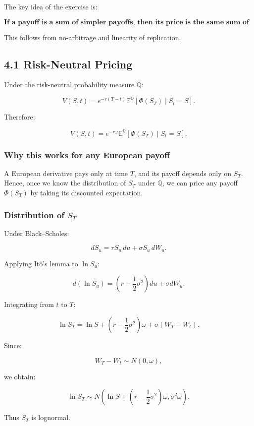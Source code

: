 \documentclass[11pt]{article}
\begin{document}
The key idea of the exercise is:

\[
\textbf{If a payoff is a sum of simpler payoffs, then its price is the same sum of prices.}
\]

This follows from no-arbitrage and linearity of replication.

\subsection*{4.1 Risk-Neutral Pricing}

Under the risk-neutral probability measure $\mathbb Q$:

\[
V(S,t)=e^{-r(T-t)}\mathbb E^{\mathbb Q}[\Phi(S_T)\mid S_t=S].
\]

Therefore:

\[
V(S,t)=e^{-r\omega}\mathbb E^{\mathbb Q}[\Phi(S_T)\mid S_t=S].
\]

\subsubsection*{Why this works for any European payoff}

A European derivative pays only at time $T$, and its payoff depends only on $S_T$.  
Hence, once we know the distribution of $S_T$ under $\mathbb Q$, we can price any payoff $\Phi(S_T)$ by taking its discounted expectation.

\subsubsection*{Distribution of $S_T$}

Under Black--Scholes:

\[
dS_u=rS_u\,du+\sigma S_u\,dW_u.
\]

Applying It\^o's lemma to $\ln S_u$:

\[
d(\ln S_u)=\left(r-\frac12\sigma^2\right)du+\sigma dW_u.
\]

Integrating from $t$ to $T$:

\[
\ln S_T=\ln S+\left(r-\frac12\sigma^2\right)\omega+\sigma(W_T-W_t).
\]

Since:

\[
W_T-W_t\sim N(0,\omega),
\]

we obtain:

\[
\ln S_T\sim N\!\left(\ln S+\left(r-\frac12\sigma^2\right)\omega,\sigma^2\omega\right).
\]

Thus $S_T$ is lognormal.
\end{document}
